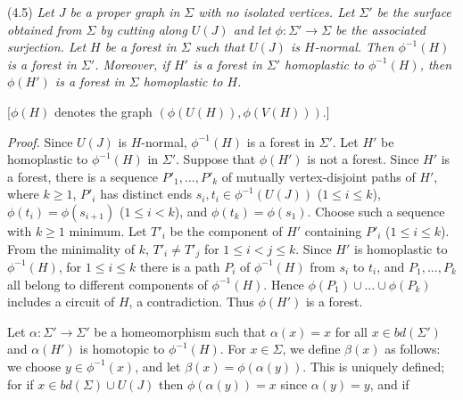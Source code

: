 \stmt
(4.5) \textit{Let $J$ be a proper graph in $\Sigma$ with no isolated vertices. Let $\Sigma'$ be the surface obtained from $\Sigma$ by cutting along $U(J)$ and let $\phi \colon \Sigma' \to \Sigma$ be the associated surjection. Let $H$ be a forest in $\Sigma$ such that $U(J)$ is $H$-normal. Then $\phi^{-1}(H)$ is a forest in $\Sigma'$. Moreover, if $H'$ is a forest in $\Sigma'$ homoplastic to $\phi^{-1}(H)$, then $\phi(H')$ is a forest in $\Sigma$ homoplastic to $H$.}

[$\phi(H)$ denotes the graph $(\phi(U(H)), \phi(V(H)))$.]

\textit{Proof.} Since $U(J)$ is $H$-normal, $\phi^{-1}(H)$ is a forest in $\Sigma'$. Let $H'$ be homoplastic to $\phi^{-1}(H)$ in $\Sigma'$. Suppose that $\phi(H')$ is not a forest. Since $H'$ is a forest, there is a sequence $P'_1, \dots, P'_k$ of mutually vertex-disjoint paths of $H'$, where $k \ge 1$, $P'_i$ has distinct ends $s_i, t_i \in \phi^{-1}(U(J))$ ($1 \le i \le k$), $\phi(t_i) = \phi(s_{i+1})$ ($1 \le i < k$), and $\phi(t_k) = \phi(s_1)$. Choose such a sequence with $k \ge 1$ minimum. Let $T'_i$ be the component of $H'$ containing $P'_i$ ($1 \le i \le k$). From the minimality of $k$, $T'_i \ne T'_j$ for $1 \le i < j \le k$. Since $H'$ is homoplastic to $\phi^{-1}(H)$, for $1 \le i \le k$ there is a path $P_i$ of $\phi^{-1}(H)$ from $s_i$ to $t_i$, and $P_1, \dots, P_k$ all belong to different components of $\phi^{-1}(H)$. Hence $\phi(P_1) \cup \dots \cup \phi(P_k)$ includes a circuit of $H$, a contradiction. Thus $\phi(H')$ is a forest.

Let $\alpha \colon \Sigma' \to \Sigma'$ be a homeomorphism such that $\alpha(x) = x$ for all $x \in bd(\Sigma')$ and $\alpha(H')$ is homotopic to $\phi^{-1}(H)$. For $x \in \Sigma$, we define $\beta(x)$ as follows: we choose $y \in \phi^{-1}(x)$, and let $\beta(x) = \phi(\alpha(y))$. This is uniquely defined; for if $x \in bd(\Sigma) \cup U(J)$ then $\phi(\alpha(y)) = x$ since $\alpha(y) = y$, and if
